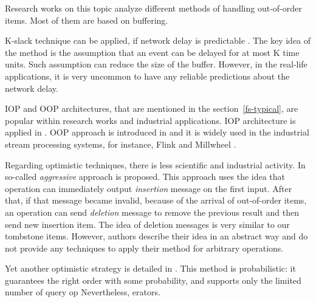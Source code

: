 
\label {fs-related}

Research works on this topic analyze different methods of handling out-of-order items. Most of them are based on buffering.

K-slack technique can be applied, if network delay is predictable \cite{Babu:2004:EKC:1016028.1016032, Li:2007:ESP:1270388.1270975}. The key idea of the method is the assumption that an event can be delayed for at most K time units. Such assumption can reduce the size of the buffer. However, in the real-life applications, it is very uncommon to have any reliable predictions about the network delay.

IOP and OOP architectures, that are mentioned in the section~\ref{fs-typical}, are popular within research works and industrial applications. IOP architecture is applied in \cite{Cranor:2003:GSD:872757.872838, Abadi:2003:ANM:950481.950485, Arasu:2006:CCQ:1146461.1146463, Ding:2004:EWJ:1031171.1031189, Hammad:2003:SSW:1315451.1315478, Hammad:2005:OIE:1116877.1116897}. OOP approach is introduced in \cite{Li:2008:OPN:1453856.1453890} and it is widely used in the industrial stream processing systems, for instance, Flink \cite{carbone2015apache} and Millwheel \cite{Akidau:2013:MFS:2536222.2536229}.

Regarding optimistic techniques, there is less scientific and industrial activity. In \cite{Wei:2009:SSO:1559845.1559973} so-called {\it aggressive} approach is proposed. This approach uses the idea that operation can immediately output {\it insertion} message on the first input. After that, if that message became invalid, because of the arrival of out-of-order items, an operation can send {\it deletion} message to remove the previous result and then send new insertion item. The idea of deletion messages is very similar to our tombstone items. However, authors describe their idea in an abstract way and do not provide any techniques to apply their method for arbitrary operations.

Yet another optimistic strategy is detailed in \cite{Li2011}. This method is probabilistic: it guarantees the right order with some probability, and supports only the limited number of query op Nevertheless, erators.
